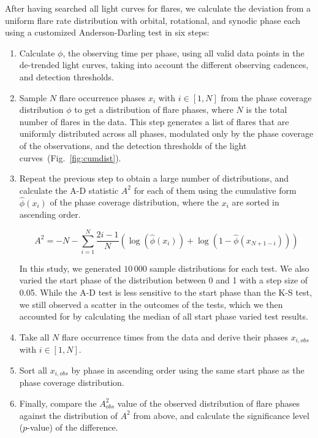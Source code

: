 \documentclass[fleqn,usenatbib]{mnras}%
\begin{document}
After having searched all light curves for flares, we calculate the deviation from a uniform flare rate distribution with orbital, rotational, and synodic phase each using a customized Anderson-Darling test in six steps:
\begin{enumerate}
\item Calculate $\phi$, the observing time per phase, using all valid data points in the de-trended light curves, taking into account the different observing cadences, and detection thresholds.
\item Sample $N$ flare occurrence phases $x_i$ with $i \in [1,N]$ from the phase coverage distribution $\phi$ to get a distribution of flare phases, where $N$ is the total number of flares in the data. This step generates a list of flares that are uniformly distributed across all phases, modulated only by the phase coverage of the observations, and the detection thresholds of the light curves~(Fig.~\ref{fig:cumdist}). 
\item Repeat the previous step to obtain a large number of distributions, and calculate the A-D statistic $A^2$ for each of them using the cumulative form $\hat{\phi}(x_i)$ of the phase coverage distribution, where the $x_i$ are sorted in ascending order. 

\begin{equation}
A^2 = - N -\displaystyle\sum_{i=1}^N \dfrac{2i-1}{N}\left(\log(\hat{\phi}(x_i))+\log(1-\hat{\phi}(x_{N+1-i}))\right)
\end{equation}

In this study, we generated $10\,000$ sample distributions for each test. We also varied the start phase of the distribution between 0 and 1 with a step size of 0.05. While the A-D test is less sensitive to the start phase than the K-S test, we still observed a scatter in the outcomes of the tests, which we then accounted for by calculating the median of all start phase varied test results.
\item Take all $N$ flare occurrence times from the data and derive their phases $x_{i,obs}$ with $i \in [1,N]$. 
\item Sort all $x_{i,obs}$ by phase in ascending order using the same start phase as the phase coverage distribution.
\item Finally, compare the $A^2_{obs}$ value of the observed distribution of flare phases against the distribution of $A^2$ from above, and calculate the significance level ($p$-value) of the difference. 
\end{enumerate}
\end{document}

